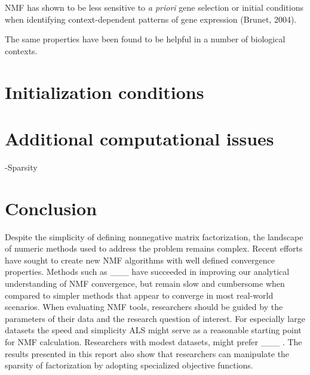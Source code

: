 \documentclass[final,leqno,onefignum,onetabnum]{siamltex1213}
\begin{document}
NMF has shown to be less sensitive to \textit{a priori} gene selection or initial conditions when identifying context-dependent patterns of gene expression (Brunet, 2004). 

The same properties have been found to be helpful in a number of biological contexts. 

\section{Initialization conditions}

\section{Additional computational issues}
-Sparsity 

\section{Conclusion} Despite the simplicity of defining nonnegative matrix factorization, the landscape of numeric methods used to address the problem remains complex. Recent efforts have sought to create new NMF algorithms with well defined convergence properties. Methods such as ___ have succeeded in improving our analytical understanding of NMF convergence, but remain slow and cumbersome when compared to simpler methods that appear to converge in most real-world scenarios. When evaluating NMF tools, researchers should be guided by the parameters of their data and the research question of interest. For especially large datasets the speed and simplicity ALS might serve as a reasonable starting point for NMF calculation. Researchers with modest datasets, might prefer ___ . The results presented in this report also show that researchers can manipulate the sparsity of factorization by adopting specialized objective functions. 
\end{document}
